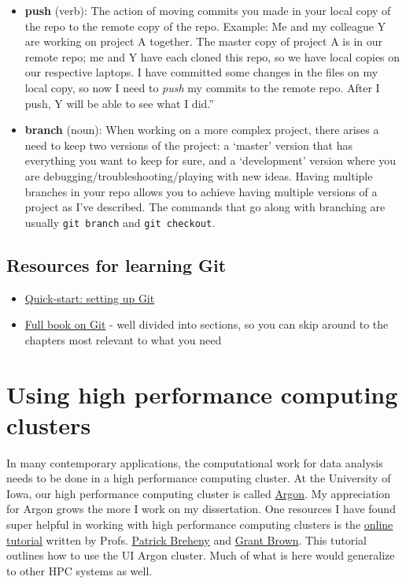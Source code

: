 \documentclass[
]{book}
\begin{document}
\begin{itemize}
\item
  \textbf{push} (verb): The action of moving commits you made in your local copy of the repo to the remote copy of the repo. Example: Me and my colleague Y are working on project A together. The master copy of project A is in our remote repo; me and Y have each cloned this repo, so we have local copies on our respective laptops. I have committed some changes in the files on my local copy, so now I need to \emph{push} my commits to the remote repo. After I push, Y will be able to see what I did.''
\item
  \textbf{branch} (noun): When working on a more complex project, there arises a need to keep two versions of the project: a `master' version that has everything you want to keep for sure, and a `development' version where you are debugging/troubleshooting/playing with new ideas. Having multiple branches in your repo allows you to achieve having multiple versions of a project as I've described. The commands that go along with branching are usually \texttt{git\ branch} and \texttt{git\ checkout}.
\end{itemize}

\hypertarget{resources-for-learning-git}{%
\subsection{Resources for learning Git}\label{resources-for-learning-git}}

\begin{itemize}
\item
  \href{https://docs.github.com/en/get-started/quickstart/set-up-git}{Quick-start: setting up Git}
\item
  \href{https://git-scm.com/book/en/v2}{Full book on Git} - well divided into sections, so you can skip around to the chapters most relevant to what you need
\end{itemize}

\hypertarget{using-high-performance-computing-clusters}{%
\section{Using high performance computing clusters}\label{using-high-performance-computing-clusters}}

In many contemporary applications, the computational work for data analysis needs to be done in a high performance computing cluster. At the University of Iowa, our high performance computing cluster is called \href{https://wiki.uiowa.edu/display/hpcdocs/Argon+Cluster}{Argon}. My appreciation for Argon grows the more I work on my dissertation. One resources I have found super helpful in working with high performance computing clusters is the \href{https://iowabiostat.github.io/hpc/index.html}{online tutorial} written by Profs. \href{https://myweb.uiowa.edu/pbreheny/}{Patrick Breheny} and \href{http://grantbrown.github.io/}{Grant Brown}. This tutorial outlines how to use the UI Argon cluster. Much of what is here would generalize to other HPC systems as well.
\end{document}
